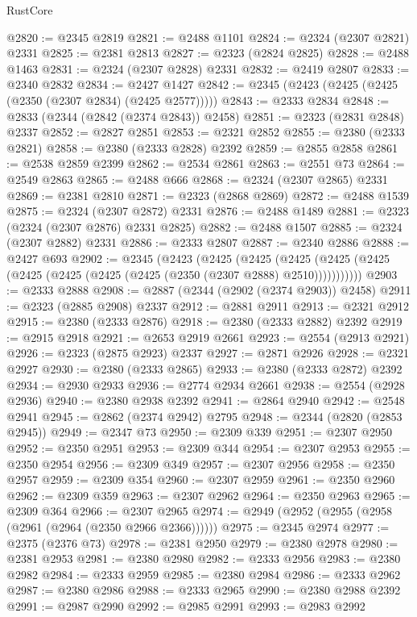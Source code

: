 \begin{lexlean}{RustCore}
\begin{coremodule}
@2820 := @2345 @2819
@2821 := @2488 @1101
@2824 := @2324 (@2307 @2821) @2331
@2825 := @2381 @2813
@2827 := @2323 (@2824 @2825)
@2828 := @2488 @1463
@2831 := @2324 (@2307 @2828) @2331
@2832 := @2419 @2807
@2833 := @2340 @2832
@2834 := @2427 @1427
@2842 := @2345 (@2423 (@2425 (@2425 (@2350 (@2307 @2834) (@2425 @2577)))))
@2843 := @2333 @2834
@2848 := @2833 (@2344 (@2842 (@2374 @2843)) @2458)
@2851 := @2323 (@2831 @2848) @2337
@2852 := @2827 @2851
@2853 := @2321 @2852
@2855 := @2380 (@2333 @2821)
@2858 := @2380 (@2333 @2828) @2392
@2859 := @2855 @2858
@2861 := @2538 @2859 @2399
@2862 := @2534 @2861
@2863 := @2551 @73
@2864 := @2549 @2863
@2865 := @2488 @666
@2868 := @2324 (@2307 @2865) @2331
@2869 := @2381 @2810
@2871 := @2323 (@2868 @2869)
@2872 := @2488 @1539
@2875 := @2324 (@2307 @2872) @2331
@2876 := @2488 @1489
@2881 := @2323 (@2324 (@2307 @2876) @2331 @2825)
@2882 := @2488 @1507
@2885 := @2324 (@2307 @2882) @2331
@2886 := @2333 @2807
@2887 := @2340 @2886
@2888 := @2427 @693
@2902 := @2345
    (@2423
      (@2425
        (@2425
          (@2425 (@2425 (@2425 (@2425 (@2425 (@2425 (@2425 (@2350 (@2307 @2888) @2510)))))))))))
@2903 := @2333 @2888
@2908 := @2887 (@2344 (@2902 (@2374 @2903)) @2458)
@2911 := @2323 (@2885 @2908) @2337
@2912 := @2881 @2911
@2913 := @2321 @2912
@2915 := @2380 (@2333 @2876)
@2918 := @2380 (@2333 @2882) @2392
@2919 := @2915 @2918
@2921 := @2653 @2919 @2661
@2923 := @2554 (@2913 @2921)
@2926 := @2323 (@2875 @2923) @2337
@2927 := @2871 @2926
@2928 := @2321 @2927
@2930 := @2380 (@2333 @2865)
@2933 := @2380 (@2333 @2872) @2392
@2934 := @2930 @2933
@2936 := @2774 @2934 @2661
@2938 := @2554 (@2928 @2936)
@2940 := @2380 @2938 @2392
@2941 := @2864 @2940
@2942 := @2548 @2941
@2945 := @2862 (@2374 @2942) @2795
@2948 := @2344 (@2820 (@2853 @2945))
@2949 := @2347 @73
@2950 := @2309 @339
@2951 := @2307 @2950
@2952 := @2350 @2951
@2953 := @2309 @344
@2954 := @2307 @2953
@2955 := @2350 @2954
@2956 := @2309 @349
@2957 := @2307 @2956
@2958 := @2350 @2957
@2959 := @2309 @354
@2960 := @2307 @2959
@2961 := @2350 @2960
@2962 := @2309 @359
@2963 := @2307 @2962
@2964 := @2350 @2963
@2965 := @2309 @364
@2966 := @2307 @2965
@2974 := @2949 (@2952 (@2955 (@2958 (@2961 (@2964 (@2350 @2966 @2366))))))
@2975 := @2345 @2974
@2977 := @2375 (@2376 @73)
@2978 := @2381 @2950
@2979 := @2380 @2978
@2980 := @2381 @2953
@2981 := @2380 @2980
@2982 := @2333 @2956
@2983 := @2380 @2982
@2984 := @2333 @2959
@2985 := @2380 @2984
@2986 := @2333 @2962
@2987 := @2380 @2986
@2988 := @2333 @2965
@2990 := @2380 @2988 @2392
@2991 := @2987 @2990
@2992 := @2985 @2991
@2993 := @2983 @2992

\end{coremodule}
\end{lexlean}
